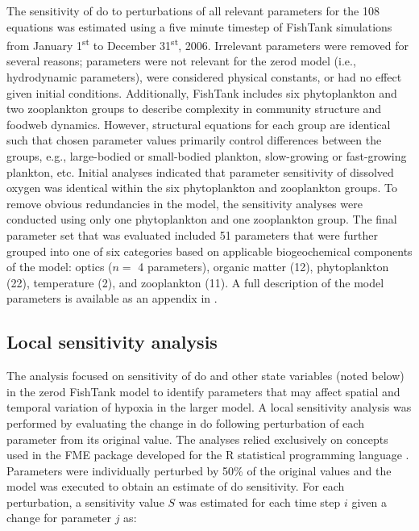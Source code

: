 \documentclass[letterpaper,12pt,oneside]{article}\usepackage[]{graphicx}\usepackage[]{color}
\begin{document}
The sensitivity of \ac{do} to perturbations of all relevant parameters for the 108 equations was estimated using a five minute timestep of FishTank simulations from January 1\textsuperscript{st} to December 31\textsuperscript{st}, 2006. Irrelevant parameters were removed for several reasons; parameters were not relevant for the \ac{zerod} model (i.e., hydrodynamic parameters), were considered physical constants, or had no effect given initial conditions.  Additionally, FishTank includes six phytoplankton and two zooplankton groups to describe complexity in community structure and foodweb dynamics.  However, structural equations for each group are identical such that chosen parameter values primarily control differences between the groups, e.g., large-bodied or small-bodied plankton, slow-growing or fast-growing plankton, etc.  Initial analyses indicated that parameter sensitivity of dissolved oxygen was identical within the six phytoplankton and zooplankton groups.  To remove obvious redundancies in the model, the sensitivity analyses were conducted using only one phytoplankton and one zooplankton group.  The final parameter set that was evaluated included 51 parameters that were further grouped into one of six categories based on applicable biogeochemical components of the model: optics ($n = $ 4 parameters), organic matter (12), phytoplankton (22), temperature (2), and zooplankton (11).  A full description of the model parameters is available as an appendix in .  

\subsection{Local sensitivity analysis}

The analysis focused on sensitivity of \ac{do} and other state variables (noted below) in the \ac{zerod} FishTank model to identify parameters that may affect spatial and temporal variation of hypoxia in the larger model.  A local sensitivity analysis was performed by evaluating the change in \ac{do} following perturbation of each parameter from its original value.  The analyses relied exclusively on concepts used in the FME package developed for the R statistical programming language \citep{Soetaert10,RDCT16}. Parameters were individually perturbed by 50\% of the original values and the model was executed to obtain an estimate of \ac{do} sensitivity.  For each perturbation, a sensitivity value $S$ was estimated for each time step $i$ given a change for parameter $j$ as:
\end{document}
